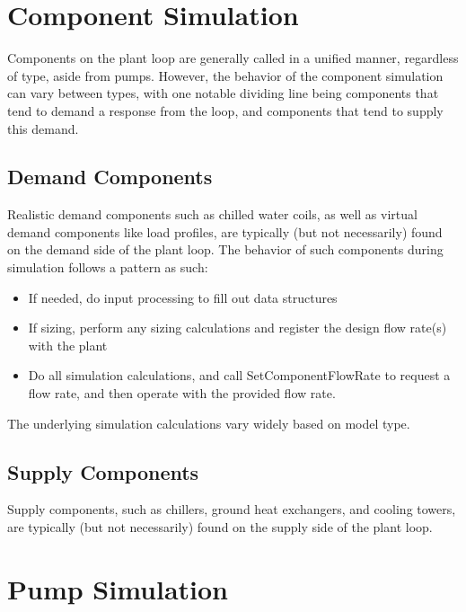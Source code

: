 \documentclass{report}
\begin{document}
    \section{Component Simulation}\label{sec:modeling-component}

      Components on the plant loop are generally called in a unified manner, regardless of type, aside from pumps.
      However, the behavior of the component simulation can vary between types, with one notable dividing line being components that tend to demand a response from the loop, and components that tend to supply this demand.

      \subsection{Demand Components}\label{subsec:modeling-component-demand}

        Realistic demand components such as chilled water coils, as well as virtual demand components like load profiles, are typically (but not necessarily) found on the demand side of the plant loop.
        The behavior of such components during simulation follows a pattern as such:
        \begin{itemize}
          \item If needed, do input processing to fill out data structures
          \item If sizing, perform any sizing calculations and register the design flow rate(s) with the plant
          \item Do all simulation calculations, and call SetComponentFlowRate to request a flow rate, and then operate with the provided flow rate.
        \end{itemize}

        The underlying simulation calculations vary widely based on model type.

      \subsection{Supply Components}\label{subsec:modeling-component-supply}

        Supply components, such as chillers, ground heat exchangers, and cooling towers, are typically (but not necessarily) found on the supply side of the plant loop.


    \section{Pump Simulation}\label{sec:modeling-pumps}
\end{document}
